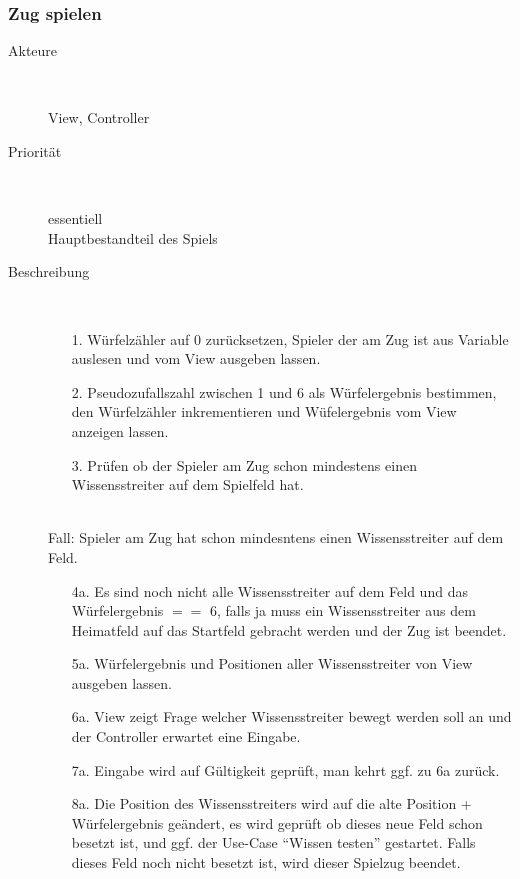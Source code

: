 \documentclass{report}
\begin{document}
    \subsubsection{Zug spielen}
    \begin{description}
        \item[Akteure]~\par
            View, Controller
        \item[Priorität]~\par
            essentiell\\Hauptbestandteil des Spiels
        \item[Beschreibung]~\par
            \begin{itemize}
                \item [1.] Würfelzähler auf 0 zurücksetzen, Spieler der am Zug ist aus Variable auslesen und vom View ausgeben lassen.
                \item [2.] Pseudozufallszahl zwischen 1 und 6 als Würfelergebnis bestimmen, den Würfelzähler inkrementieren und Wüfelergebnis vom View anzeigen lassen.
                \item [3.] Prüfen ob der Spieler am Zug schon mindestens einen Wissensstreiter auf dem Spielfeld hat.
            \end{itemize}
            \\ Fall: Spieler am Zug hat schon mindesntens einen Wissensstreiter auf dem Feld.
            \begin{itemize}
                \item [4a.] Es sind noch nicht alle Wissensstreiter auf dem Feld und das Würfelergebnis $==$ 6, falls ja muss ein Wissensstreiter aus dem Heimatfeld auf das Startfeld gebracht werden und der Zug ist beendet.
                \item [5a.] Würfelergebnis und Positionen aller Wissensstreiter von View ausgeben lassen.
                \item [6a.] View zeigt Frage welcher Wissensstreiter bewegt werden soll an und der Controller erwartet eine Eingabe.
                \item [7a.] Eingabe wird auf Gültigkeit geprüft, man kehrt ggf. zu 6a zurück.
                \item [8a.] Die Position des Wissensstreiters wird auf die alte Position + Würfelergebnis geändert, es wird geprüft ob dieses neue Feld schon besetzt ist, und ggf. der Use-Case "`Wissen testen"' gestartet. Falls dieses Feld noch nicht besetzt ist, wird dieser Spielzug beendet.

\end{itemize}
\end{description}
\end{document}
